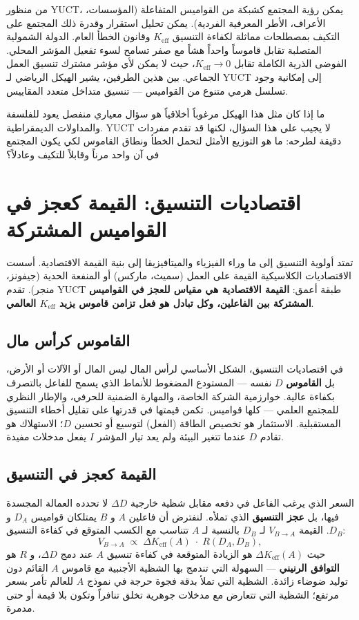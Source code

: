 \documentclass[12pt,a4paper]{article}
\newcommand{\Keff}{K_{\mathrm{eff}}}
\begin{document}
	من منظور YUCT، يمكن رؤية المجتمع كشبكة من القواميس المتفاعلة (المؤسسات، الأعراف، الأطر المعرفية الفردية). يمكن تحليل استقرار وقدرة ذلك المجتمع على التكيف بمصطلحات مماثلة لكفاءة التنسيق \(K_{\mathrm{eff}}\) وقانون الخطأ العام. الدولة الشمولية المتصلبة تقابل قاموساً واحداً هشاً مع صفر تسامح لسوء تفعيل المؤشر المحلي. الفوضى الذرية الكاملة تقابل \(K_{\mathrm{eff}} \to 0\)، حيث لا يمكن لأي مؤشر مشترك تنسيق العمل الجماعي. بين هذين الطرفين، يشير الهيكل الرياضي لـ YUCT إلى إمكانية وجود تسلسل هرمي متنوع من القواميس — تنسيق متداخل متعدد المقاييس.
	
	ما إذا كان مثل هذا الهيكل مرغوباً أخلاقياً هو سؤال معياري منفصل يعود للفلسفة والمداولات الديمقراطية. YUCT لا يجيب على هذا السؤال، لكنها قد تقدم مفردات دقيقة لطرحه: ما هو التوزيع الأمثل لتحمل الخطأ ونطاق القاموس لكي يكون المجتمع في آن واحد مرناً وقابلاً للتكيف وعادلاً؟
	
	\section{اقتصاديات التنسيق: القيمة كعجز في القواميس المشتركة}
	\label{sec:coordination-economics}
	
	تمتد أولوية التنسيق إلى ما وراء الفيزياء والميتافيزيقا إلى بنية القيمة الاقتصادية. أسست الاقتصاديات الكلاسيكية القيمة على العمل (سميث، ماركس) أو المنفعة الحدية (جيفونز، منجر). تقدم YUCT طبقة أعمق: \textbf{القيمة الاقتصادية هي مقياس للعجز في القواميس المشتركة بين الفاعلين، وكل تبادل هو فعل تزامن قاموس يزيد \(K_{\mathrm{eff}}\) العالمي}.
	
	\subsection{القاموس كرأس مال}
	
	في اقتصاديات التنسيق، الشكل الأساسي لرأس المال ليس المال أو الآلات أو الأرض، بل \textbf{القاموس} \(D\) نفسه — المستودع المضغوط للأنماط الذي يسمح للفاعل بالتصرف بكفاءة عالية. خوارزمية الشركة الخاصة، والمهارة الضمنية للحرفي، والإطار النظري للمجتمع العلمي — كلها قواميس. تكمن قيمتها في قدرتها على تقليل أخطاء التنسيق المستقبلية. الاستثمار هو تخصيص الطاقة (الفعل) لتوسيع أو تحسين \(D\)؛ الاستهلاك هو تقادم \(D\) عندما تتغير البيئة ولم يعد تيار المؤشر \(I\) يفعل مدخلات مفيدة.
	
	\subsection{القيمة كعجز في التنسيق}
	
	السعر الذي يرغب الفاعل في دفعه مقابل شظية خارجية \(\Delta D\) لا تحدده العمالة المجسدة فيها، بل \textbf{عجز التنسيق} الذي تملأه. لنفترض أن فاعلين \(A\) و \(B\) يمتلكان قواميس \(D_A\) و \(D_B\). القيمة \(V_{B \rightarrow A}\) لـ \(D_B\) بالنسبة لـ \(A\) تتناسب مع الكسب المتوقع في كفاءة التنسيق:
	\[
	V_{B \rightarrow A} \; \propto \; \Delta\Keff(A) \; \cdot \; R(D_A, D_B),
	\]
	حيث \(\Delta\Keff(A)\) هو الزيادة المتوقعة في كفاءة تنسيق \(A\) عند دمج \(\Delta D\)، و \(R\) هو \textbf{التوافق الرنيني} — السهولة التي تندمج بها الشظية الأجنبية مع قاموس \(A\) القائم دون توليد ضوضاء زائدة. الشظية التي تملأ بدقة فجوة حرجة في نموذج \(A\) للعالم تأمر بسعر مرتفع؛ الشظية التي تتعارض مع مدخلات جوهرية تخلق تنافراً وتكون بلا قيمة أو حتى مدمرة.
	
\end{document}
